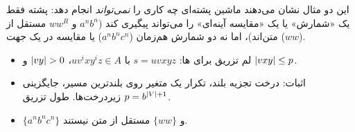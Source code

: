 \begin{note}
این دو مثال نشان می‌دهند ماشین پشته‌ای چه کاری را \emph{نمی‌تواند} انجام دهد: پشته فقط یک «شمارش» یا یک «مقایسه آینه‌ای» را می‌تواند پیگیری کند ($a^nb^n$ و $ww^R$ مستقل از متن‌اند)، اما نه دو شمارش هم‌زمان ($a^nb^nc^n$) یا مقایسه در یک جهت ($ww$).
\end{note}

\begin{summary}
\begin{itemize}
\item لم تزریق برای ها: $s=uvxyz$ با $uv^ixy^iz\in A$، $\lvert vy\rvert>0$ و $\lvert vxy\rvert\le p$.
\item اثبات: درخت تجزیه بلند، تکرار یک متغیر روی بلندترین مسیر، جایگزینی زیردرخت‌ها. طول تزریق $p=b^{\lvert V\rvert+1}$.
\item $\{a^nb^nc^n\}$ و $\{ww\}$ مستقل از متن نیستند.
\end{itemize}
\end{summary}
